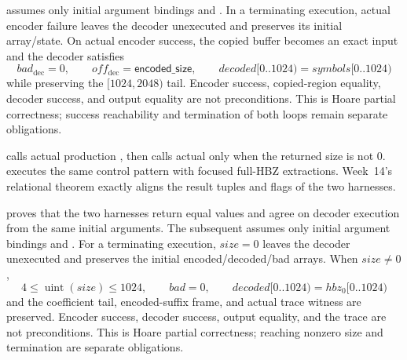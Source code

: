 \begin{verified}
\label{thm:rans-core-actual-inverse}
 assumes only initial
argument bindings and . In a terminating
execution, actual encoder failure leaves the decoder unexecuted and preserves
its initial array/state. On actual encoder success, the copied buffer becomes
an exact  input and the decoder satisfies
\[
  bad_{\mathrm{dec}}=0,\qquad
  off_{\mathrm{dec}}=\mathsf{encoded\_size},\qquad
  decoded[0..1024)=symbols[0..1024)
\]
while preserving the \([1024,2048)\) tail. Encoder success, copied-region
equality, decoder success, and output equality are not preconditions. This is
Hoare partial correctness; success reachability and termination of both loops
remain separate obligations.
\end{verified}

\begin{definition}
\label{def:production-full-hbz-harness}
 calls actual production
, then calls actual
 only when the
returned size is not 0.  executes the
same control pattern with focused full-HBZ extractions. Week~14's relational
theorem exactly aligns the result tuples and  flags
of the two harnesses.
\end{definition}

\begin{verified}
\label{thm:production-full-hbz-inverse}
 proves that the
two harnesses return equal values and agree on decoder execution from the
same initial arguments. The subsequent
 assumes only initial
argument bindings and . For a terminating
execution, \(size=0\) leaves the decoder unexecuted and preserves the initial
encoded/decoded/bad arrays. When \(size\ne0\),
\[
  4\le\operatorname{uint}(size)\le1024,
  \qquad bad=0,
  \qquad decoded[0..1024)=hbz_0[0..1024)
\]
and the coefficient tail, encoded-suffix frame, and actual
 trace witness are preserved. Encoder success,
decoder success, output equality, and the trace are not preconditions. This is
Hoare partial correctness; reaching nonzero size and termination are separate obligations.
\end{verified}

